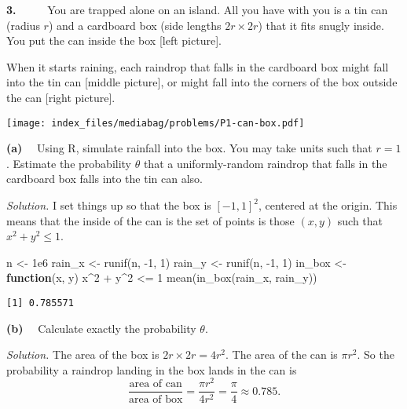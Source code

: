 \documentclass[
  letterpaper,
  DIV=11,
  numbers=noendperiod]{scrreprt}
\newenvironment{Shaded}{\begin{snugshade}}{\end{snugshade}}
\newcommand{\ControlFlowTok}[1]{\textcolor[rgb]{0.00,0.23,0.31}{\textbf{#1}}}
\newcommand{\DecValTok}[1]{\textcolor[rgb]{0.68,0.00,0.00}{#1}}
\newcommand{\FloatTok}[1]{\textcolor[rgb]{0.68,0.00,0.00}{#1}}
\newcommand{\FunctionTok}[1]{\textcolor[rgb]{0.28,0.35,0.67}{#1}}
\newcommand{\NormalTok}[1]{\textcolor[rgb]{0.00,0.23,0.31}{#1}}
\newcommand{\OtherTok}[1]{\textcolor[rgb]{0.00,0.23,0.31}{#1}}
\newcommand{\SpecialCharTok}[1]{\textcolor[rgb]{0.37,0.37,0.37}{#1}}
\theoremstyle{plain}
\theoremstyle{definition}
\theoremstyle{definition}
\theoremstyle{remark}
\begin{document}
\textbf{3.} ~~~~~You are trapped alone on an island. All you have with
you is a tin can (radius \(r\)) and a cardboard box (side lengths
\(2r \times 2r\)) that it fits snugly inside. You put the can inside the
box {[}left picture{]}.

When it starts raining, each raindrop that falls in the cardboard box
might fall into the tin can {[}middle picture{]}, or might fall into the
corners of the box outside the can {[}right picture{]}.

\texttt{[image: index\_files/mediabag/problems/P1-can-box.pdf]}

\textbf{(a)} ~~Using R, simulate rainfall into the box. You may take
units such that \(r = 1\). Estimate the probability \(\theta\) that a
uniformly-random raindrop that falls in the cardboard box falls into the
tin can also.

\emph{Solution.} I set things up so that the box is \([-1, 1]^2\),
centered at the origin. This means that the inside of the can is the set
of points is those \((x,y)\) such that \(x^2 + y^2 \leq 1\).

\begin{Shaded}
\begin{Highlighting}[]
\NormalTok{n }\OtherTok{\textless{}{-}} \FloatTok{1e6}
\NormalTok{rain\_x }\OtherTok{\textless{}{-}} \FunctionTok{runif}\NormalTok{(n, }\SpecialCharTok{{-}}\DecValTok{1}\NormalTok{, }\DecValTok{1}\NormalTok{)}
\NormalTok{rain\_y }\OtherTok{\textless{}{-}} \FunctionTok{runif}\NormalTok{(n, }\SpecialCharTok{{-}}\DecValTok{1}\NormalTok{, }\DecValTok{1}\NormalTok{)}
\NormalTok{in\_box }\OtherTok{\textless{}{-}} \ControlFlowTok{function}\NormalTok{(x, y) x}\SpecialCharTok{\^{}}\DecValTok{2} \SpecialCharTok{+}\NormalTok{ y}\SpecialCharTok{\^{}}\DecValTok{2} \SpecialCharTok{\textless{}=} \DecValTok{1}
\FunctionTok{mean}\NormalTok{(}\FunctionTok{in\_box}\NormalTok{(rain\_x, rain\_y))}
\end{Highlighting}
\end{Shaded}

\begin{verbatim}
[1] 0.785571
\end{verbatim}

\textbf{(b)} ~~Calculate exactly the probability \(\theta\).

\emph{Solution.} The area of the box is \(2r \times 2r = 4r^2\). The
area of the can is \(\pi r^2\). So the probability a raindrop landing in
the box lands in the can is
\[ \frac{\text{area of can}}{\text{area of box}} = \frac{\pi r^2}{4r^2} = \frac{\pi}{4} \approx 0.785. \]
\end{document}
